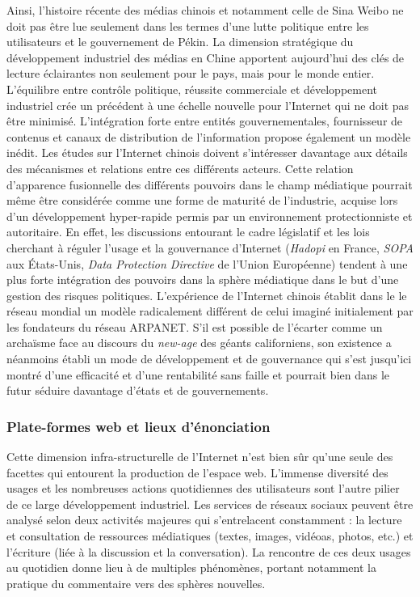 Ainsi, l'histoire récente des médias chinois et notamment celle de Sina Weibo ne doit pas être lue seulement dans les termes d'une lutte politique entre les utilisateurs et le gouvernement de Pékin. La dimension stratégique du développement industriel des médias en Chine apportent aujourd'hui des clés de lecture éclairantes non seulement pour le pays, mais pour le monde entier. L'équilibre entre contrôle politique, réussite commerciale et développement industriel crée un précédent à une échelle nouvelle pour l'Internet qui ne doit pas être minimisé. L'intégration forte entre entités gouvernementales, fournisseur de contenus et canaux de distribution de l'information propose également un modèle inédit. Les études sur l'Internet chinois doivent s'intéresser davantage aux détails des mécanismes et relations entre ces différents acteurs. Cette relation d'apparence fusionnelle des différents pouvoirs dans le champ médiatique pourrait même être considérée comme une forme de maturité de l'industrie, acquise lors d'un développement hyper-rapide permis par un environnement protectionniste et autoritaire. En effet, les  discussions entourant le cadre législatif et les lois cherchant à réguler l'usage et la gouvernance d'Internet (\textit{Hadopi} en France, \textit{SOPA} aux États-Unis, \textit{Data Protection Directive} de l'Union Européenne) tendent à une plus forte intégration des pouvoirs dans la sphère médiatique dans le but d'une gestion des risques politiques. L'expérience de l'Internet chinois établit dans le le réseau mondial un modèle  radicalement différent de celui imaginé initialement par les fondateurs du réseau ARPANET. S'il est possible de l'écarter comme un archaïsme face au discours du \textit{new-age} des géants californiens, son existence a néanmoins établi un mode de développement et de gouvernance qui s'est jusqu'ici montré d'une efficacité et d'une rentabilité sans faille et pourrait bien dans le futur séduire davantage d'états et de gouvernements.

\subsubsection{Plate-formes web et lieux d'énonciation}

Cette dimension infra-structurelle de l'Internet n'est bien sûr qu'une seule des facettes qui entourent la production de l'espace web. L'immense diversité des usages et les nombreuses actions quotidiennes des utilisateurs sont l'autre pilier de ce large développement industriel. Les services de réseaux sociaux peuvent être analysé selon deux activités majeures qui s'entrelacent constamment : la lecture et consultation de ressources médiatiques (textes, images, vidéoas, photos, etc.) et l'écriture (liée à la discussion et la conversation). La rencontre de ces deux usages au quotidien donne lieu à de multiples phénomènes, portant notamment la pratique du commentaire vers des sphères nouvelles.


